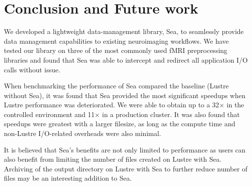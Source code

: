     
    
    
    \section{Conclusion and Future work}

    We developed a lightweight data-management library, Sea, to seamlessly
    provide data management capabilities to existing neuroimaging workflows.
    We have tested our library on three of the most commonly used fMRI preprocessing
    libraries and found that Sea was able to intercept and redirect all application I/O
    calls without issue. 

    When benchmarking the performance of Sea compared the baseline (Lustre without Sea),
    it was found that Sea provided the most significant speedups when Lustre performance was
    deteriorated. We were able to obtain up to a 32$\times$ in the controlled environment and 11$\times$
    in a production cluster. It was also found that speedups were greatest with a larger filesize, as long
    as the compute time and non-Lustre I/O-related overheads were also minimal.

    It is believed that Sea's benefits are not only limited to performance as users can
    also benefit from limiting the number of files created on Lustre with Sea. Archiving of the output 
    directory on Lustre with Sea to further reduce number of files may be an interesting addition to Sea.